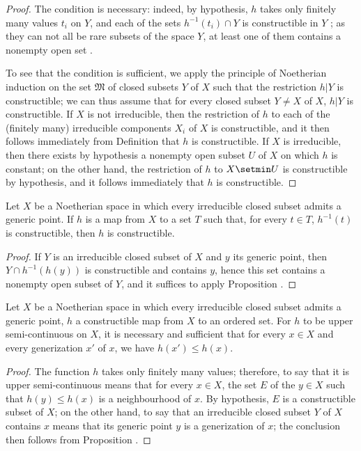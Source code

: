 \begin{proof}
The condition is necessary: indeed, by hypothesis, $h$ takes only finitely many values $t_i$ on $Y$, and each of the sets $h^{-1}(t_i)\cap Y$ is constructible in $Y$ ; as they can not all be rare subsets of the space $Y$, at least one of them contains a nonempty open set .

To see that the condition is sufficient, we apply the principle of Noetherian induction on the set $\mathfrak{M}$ of closed subsets $Y$ of $X$ such that the restriction $h|Y$ is constructible; we can thus assume that for every closed subset $Y\neq X$ of $X$,
$h|Y$ is constructible.
If $X$ is not irreducible, then the restriction of $h$ to each of the (finitely many) irreducible components $X_i$ of $X$ is constructible, and it then follows immediately from Definition  that $h$ is constructible.
If $X$ is irreducible, then there exists by hypothesis a nonempty open subset $U$ of $X$ on which $h$ is constant; on the other hand, the restriction of $h$ to $X\setmin U$ is constructible by hypothesis, and it follows immediately that $h$ is constructible.
\end{proof}

\begin{corollary}[9.3.3]
\label{0.9.3.3}
Let $X$ be a Noetherian space in which every irreducible closed subset admits a generic point.
If $h$ is a map from $X$ to a set $T$ such that, for every $t\in T$, $h^{-1}(t)$ is constructible, then $h$ is constructible.
\end{corollary}

\begin{proof}
If $Y$ is an irreducible closed subset of $X$ and $y$ its generic point, then $Y\cap h^{-1}(h(y))$ is constructible and contains $y$, hence  this set contains a nonempty open subset of $Y$, and it suffices to apply Proposition .
\end{proof}

\begin{proposition}[9.3.4]
\label{0.9.3.4}
Let $X$ be a Noetherian space in which every irreducible closed subset admits a generic point, $h$ a constructible map from $X$ to an ordered set.
For $h$ to be upper semi-continuous on $X$, it is necessary and sufficient that for every $x\in X$ and every generization  $x'$ of $x$, we have $h(x')\leq h(x)$.
\end{proposition}

\begin{proof}
The function $h$ takes only finitely many values; therefore, to say that it is upper semi-continuous means that for every $x\in X$, the set $E$ of the $y\in X$ such that $h(y)\leq h(x)$ is a neighbourhood of $x$.
By hypothesis, $E$ is a constructible subset of $X$; on the other hand, to say that an irreducible closed subset $Y$ of $X$ contains $x$ means that its generic point $y$ is a generization of $x$; the conclusion then follows from Proposition .
\end{proof}
